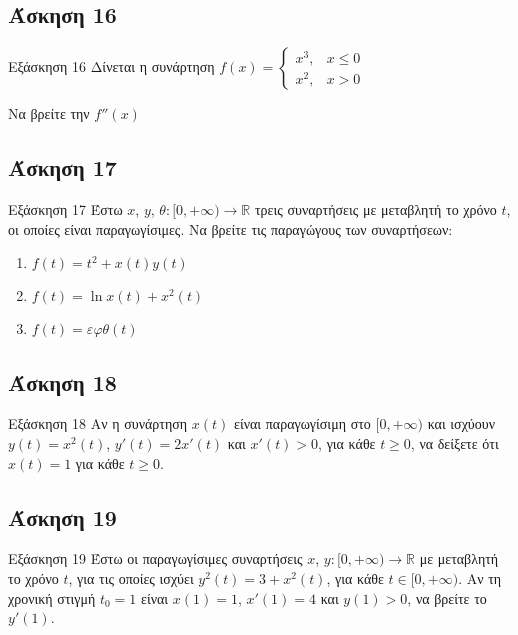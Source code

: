 \documentclass[greek]{beamer}
\begin{document}
\subsection{Άσκηση 16}
\begin{frame}[label=Άσκηση16]{Εξάσκηση 16}
  Δίνεται η συνάρτηση
  $f(x)=\begin{cases}
      x^3, & x\le 0 \\
      x^2, & x>0
    \end{cases}$

  Να βρείτε την $f''(x)$

\end{frame}

\subsection{Άσκηση 17}
\begin{frame}[label=Άσκηση17]{Εξάσκηση 17}
  Έστω $x$, $y$, $θ:[0,+\infty)\to \mathbb{R}$ τρεις συναρτήσεις με μεταβλητή το χρόνο $t$, οι οποίες είναι παραγωγίσιμες. Να βρείτε τις παραγώγους των συναρτήσεων:
  \begin{enumerate}
    \item<1-> $f(t)=t^2+x(t)y(t)$
    \item<2-> $f(t)=\ln x(t) +x^2(t)$
    \item<3-> $f(t)=εφθ(t)$
  \end{enumerate}

\end{frame}

\subsection{Άσκηση 18}
\begin{frame}[label=Άσκηση18]{Εξάσκηση 18}
  Αν η συνάρτηση $x(t)$ είναι παραγωγίσιμη στο $[0,+\infty)$ και ισχύουν $y(t)=x^2(t)$, $y'(t)=2x'(t)$ και $x'(t)>0$, για κάθε $t\ge 0$, να δείξετε ότι $x(t)=1$ για κάθε $t\ge 0$.

\end{frame}

\subsection{Άσκηση 19}
\begin{frame}[label=Άσκηση19]{Εξάσκηση 19}
  Έστω οι παραγωγίσιμες συναρτήσεις $x$, $y:[0,+\infty)\to\mathbb{R}$ με μεταβλητή το χρόνο $t$, για τις οποίες ισχύει $y^2(t)=3+x^2(t)$, για κάθε $t\in [0,+\infty )$. Αν τη χρονική στιγμή $t_0=1$ είναι $x(1)=1$, $x'(1)=4$ και $y(1)>0$, να βρείτε το $y'(1)$.

\end{frame}
\end{document}
